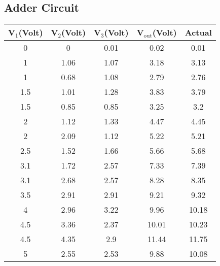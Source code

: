 \documentclass[12pt]{article}
\begin{document}
\subsection{Adder Circuit}
\begin{table}[H]
	\centering
	\begin{tabular}{|c|c|c|c|c|}
		\hline
		V$_1$(Volt) & V$_2$(Volt) & V$_3$(Volt) & V$_\mathrm{out}$(Volt) & Actual \\ \hline \hline
		0                    & 0                    & 0.01                 & 0.02                   & 0.01            \\ \hline
		1                    & 1.06                 & 1.07                 & 3.18                   & 3.13            \\ \hline
		1                    & 0.68                 & 1.08                 & 2.79                   & 2.76            \\ \hline
		1.5                  & 1.01                 & 1.28                 & 3.83                   & 3.79            \\ \hline
		1.5                  & 0.85                 & 0.85                 & 3.25                   & 3.2             \\ \hline
		2                    & 1.12                 & 1.33                 & 4.47                   & 4.45            \\ \hline
		2                    & 2.09                 & 1.12                 & 5.22                   & 5.21            \\ \hline
		2.5                  & 1.52                 & 1.66                 & 5.66                   & 5.68            \\ \hline
		3.1                  & 1.72                 & 2.57                 & 7.33                   & 7.39            \\ \hline
		3.1                  & 2.68                 & 2.57                 & 8.28                   & 8.35            \\ \hline
		3.5                  & 2.91                 & 2.91                 & 9.21                   & 9.32            \\ \hline
		4                    & 2.96                 & 3.22                 & 9.96                   & 10.18           \\ \hline
		4.5                  & 3.36                 & 2.37                 & 10.01                  & 10.23           \\ \hline
		4.5                  & 4.35                 & 2.9                  & 11.44                  & 11.75           \\ \hline
		5                    & 2.55                 & 2.53                 & 9.88                   & 10.08           \\ \hline
	\end{tabular}
\end{table}
\end{document}
